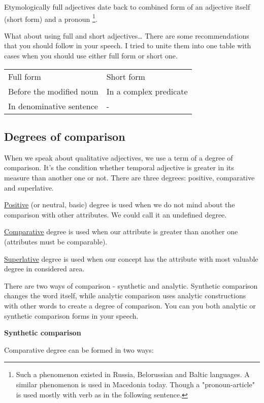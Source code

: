 Etymologically full adjectives date back to combined form of an adjective itself (short form) and a pronoun \footnote{Such a phenomenon existed in Russia, Belorussian and Baltic languages. A similar phenomenon is used in Macedonia today. Though a "pronoun-article" is used mostly with verb as in the following sentence.}. 

What about using full and short adjectives… There are some recommendations that you should follow in your speech. I tried to unite them into one table with cases when you should use either full form or short one.

\begin{table}
	\begin{tabular}{ll}
		Full form & Short form \\
		Before the modified noun & In a complex predicate \\
		In denominative sentence & - \\
	\end{tabular}
\end{table}


\subsection{Degrees of comparison}

When we speak about qualitative adjectives, we use a term of a degree of comparison. It’s the condition whether temporal adjective is greater in its measure than another one or not. There are three degrees: positive, comparative and superlative.

\underline{Positive} (or neutral, basic) degree is used when we do not mind about the comparison with other attributes. We could call it an undefined degree.

\underline{Comparative} degree is used when our attribute is greater than another one (attributes must be comparable).  

\underline{Superlative} degree is used when our concept has the attribute with most valuable degree in considered area.

There are two ways of comparison - synthetic and analytic. Synthetic comparison changes the word itself, while analytic comparison uses analytic constructions with other words to create a degree of comparison. You can you both analytic or synthetic comparison forms in your speech.

\textbf{Synthetic comparison}

Comparative degree can be formed in two ways: 

